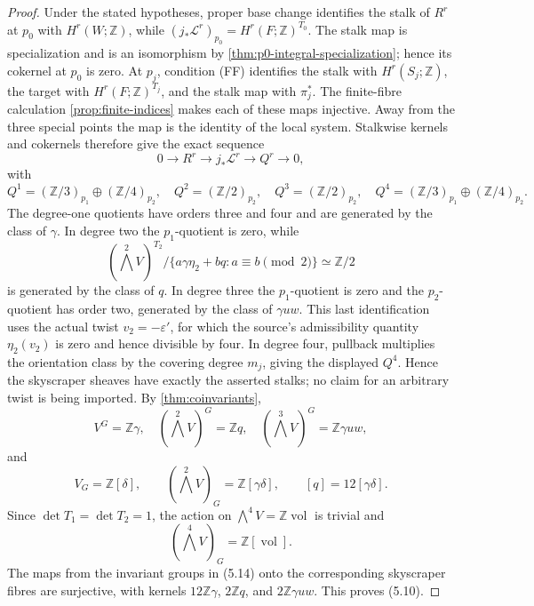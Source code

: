 \begin{proof}
Under the stated hypotheses, proper base change identifies the stalk of
\(R^r\) at \(p_0\) with \(H^r(W;\mathbb Z)\), while
\((j_*\mathcal L^r)_{p_0}=H^r(F;\mathbb Z)^{T_0}\).  The stalk map is
specialization and is an isomorphism by
\cref{thm:p0-integral-specialization}; hence its cokernel at \(p_0\) is zero.
At \(p_j\), condition \textup{(FF)} identifies the stalk with
\(H^r(S_j;\mathbb Z)\), the target with
\(H^r(F;\mathbb Z)^{T_j}\), and the stalk map with \(\pi_j^*\).  The
finite-fibre calculation \cref{prop:finite-indices} makes each of these maps
injective.  Away from the three special points the map is the identity of
the local system.  Stalkwise kernels and cokernels therefore give the exact
sequence
\[
0\longrightarrow R^r\longrightarrow j_*\mathcal L^r
\longrightarrow Q^r\longrightarrow0,
\tag{5.13}
\]
with
\[
Q^1=(\mathbb Z/3)_{p_1}\oplus(\mathbb Z/4)_{p_2},
\quad Q^2=(\mathbb Z/2)_{p_2},
\quad Q^3=(\mathbb Z/2)_{p_2},
\quad Q^4=(\mathbb Z/3)_{p_1}\oplus(\mathbb Z/4)_{p_2}.
\]
The degree-one quotients have orders three and four and are generated by the
class of \(\gamma\).  In degree two the \(p_1\)-quotient is zero, while
\[
 (\textstyle\bigwedge^2V)^{T_2}/
 \{a\gamma\eta_2+bq:a\equiv b\pmod2\}\simeq\mathbb Z/2
\]
is generated by the class of \(q\).  In degree three the \(p_1\)-quotient
is zero and the \(p_2\)-quotient has order two, generated by the class of
\(\gamma uw\).  This last identification uses the actual twist
\(v_2=-\varepsilon'\), for which the source's admissibility quantity
\(\eta_2(v_2)\) is zero and hence divisible by four.  In degree four,
pullback multiplies the orientation class by the covering
degree \(m_j\), giving the displayed \(Q^4\).  Hence the skyscraper sheaves
have exactly the asserted stalks; no claim for an arbitrary twist is being
imported.
By \cref{thm:coinvariants},
\[
V^G=\mathbb Z\gamma,\quad
(\textstyle\bigwedge^2V)^G=\mathbb Zq,\quad
(\textstyle\bigwedge^3V)^G=\mathbb Z\gamma uw,
\tag{5.14}
\]
and
\[
V_G=\mathbb Z[\delta],\qquad
(\textstyle\bigwedge^2V)_G=\mathbb Z[\gamma\delta],\qquad
[q]=12[\gamma\delta].
\tag{5.15}
\]
Since \(\det T_1=\det T_2=1\), the action on
\(\bigwedge^4V=\mathbb Z\operatorname{vol}\) is trivial and
\[
 (\textstyle\bigwedge^4V)_G=\mathbb Z[\operatorname{vol}].
\tag{5.15a}
\]
The maps from the invariant groups in (5.14) onto the corresponding
skyscraper fibres are surjective, with kernels
\(12\mathbb Z\gamma\), \(2\mathbb Zq\), and
\(2\mathbb Z\gamma uw\).  This proves (5.10).


\end{proof}
